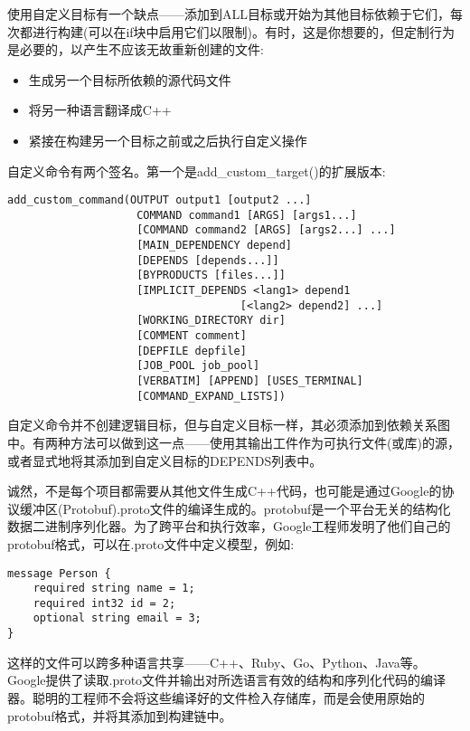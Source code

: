 
使用自定义目标有一个缺点——添加到ALL目标或开始为其他目标依赖于它们，每次都进行构建(可以在if块中启用它们以限制)。有时，这是你想要的，但定制行为是必要的，以产生不应该无故重新创建的文件:

\begin{itemize}
\item 
生成另一个目标所依赖的源代码文件

\item 
将另一种语言翻译成C++

\item 
紧接在构建另一个目标之前或之后执行自定义操作
\end{itemize}

自定义命令有两个签名。第一个是add\_custom\_target()的扩展版本:

\begin{lstlisting}[style=styleCMake]
add_custom_command(OUTPUT output1 [output2 ...]
					COMMAND command1 [ARGS] [args1...]
					[COMMAND command2 [ARGS] [args2...] ...]
					[MAIN_DEPENDENCY depend]
					[DEPENDS [depends...]]
					[BYPRODUCTS [files...]]
					[IMPLICIT_DEPENDS <lang1> depend1
									[<lang2> depend2] ...]
					[WORKING_DIRECTORY dir]
					[COMMENT comment]
					[DEPFILE depfile]
					[JOB_POOL job_pool]
					[VERBATIM] [APPEND] [USES_TERMINAL]
					[COMMAND_EXPAND_LISTS])
\end{lstlisting}

自定义命令并不创建逻辑目标，但与自定义目标一样，其必须添加到依赖关系图中。有两种方法可以做到这一点——使用其输出工件作为可执行文件(或库)的源，或者显式地将其添加到自定义目标的DEPENDS列表中。


诚然，不是每个项目都需要从其他文件生成C++代码，也可能是通过Google的协议缓冲区(Protobuf).proto文件的编译生成的。protobuf是一个平台无关的结构化数据二进制序列化器。为了跨平台和执行效率，Google工程师发明了他们自己的protobuf格式，可以在.proto文件中定义模型，例如:

\begin{lstlisting}[style=styleCMake]
message Person {
	required string name = 1;
	required int32 id = 2;
	optional string email = 3;
}
\end{lstlisting}

这样的文件可以跨多种语言共享——C++、Ruby、Go、Python、Java等。Google提供了读取.proto文件并输出对所选语言有效的结构和序列化代码的编译器。聪明的工程师不会将这些编译好的文件检入存储库，而是会使用原始的protobuf格式，并将其添加到构建链中。

